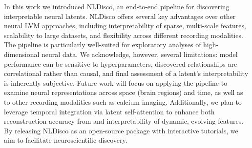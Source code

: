 \documentclass{article}
\begin{document}
In this work we introduced NLDisco, an end-to-end pipeline for discovering interpretable neural latents. NLDisco offers several key advantages over other neural LVM approaches, including interpretability of sparse, multi-scale features, scalability to large datasets, and flexibility across different recording modalities. The pipeline is particularly well-suited for exploratory analyses of high-dimensional neural data. We acknowledge, however, several limitations: model performance can be sensitive to hyperparameters, discovered relationships are correlational rather than causal, and final assessment of a latent's interpretability is inherently subjective. Future work will focus on applying the pipeline to examine neural representations across space (brain regions) and time, as well as to other recording modalities such as calcium imaging. Additionally, we plan to leverage temporal integration via latent self-attention to enhance both reconstruction accuracy from and interpretability of dynamic, evolving features. By releasing NLDisco as an open-source package with interactive tutorials, we aim to facilitate neuroscientific discovery.

\clearpage

\nocite{lenail_2019_nnsvg, campagner_2025_aeon_platform}






\end{document}
